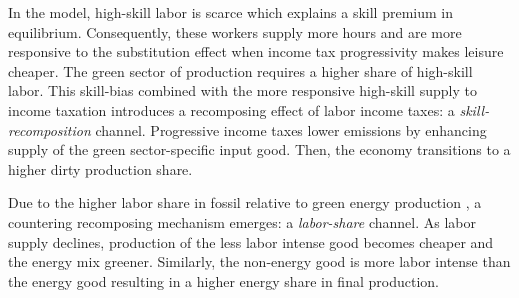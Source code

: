 
In the model, high-skill labor is scarce which explains a skill premium in equilibrium. Consequently, these workers supply more hours and are more responsive to the substitution effect when income tax progressivity makes leisure cheaper.
The green sector of production requires a higher share of high-skill labor. This skill-bias combined with the more responsive high-skill supply to income taxation introduces a recomposing effect of labor income taxes: a \textit{skill-recomposition} channel.
Progressive income taxes lower emissions by enhancing supply of the green sector-specific input good.  Then, the economy transitions to a higher dirty production share. 

Due to the higher labor share in fossil relative to green energy production \citep{Fried2018ClimateAnalysis}, a countering recomposing mechanism emerges: a \textit{labor-share} channel. As labor supply declines, production of the less labor intense good becomes cheaper and the energy mix greener. Similarly, the non-energy good is more labor intense than the energy good resulting in a higher energy share in final production. 

	\begin{comment}
content...
Directed technical change amplifies or mitigates this recomposing effect of the income tax. The market size effect renders research in the sector with the larger input market more profitable, whereas the price effect increases demand for scientists in the sector with the relatively scarcer good. Since the two energy goods are substitutes, previous research suggests that the market effect dominates and research is directed towards the sector with the bigger input market, that is, the fossil sector. 
As regards final good production, energy and non-energy goods are complements so that the price effect is expected to dominate and the recomposition towards high-skill supply should boost research in energy goods relative to non-energy goods.\footnote{\ For a discussion of these two mechanisms compare \cite{Acemoglu2002DirectedChange, Loebbing2019NationalChange, Hemous2021DirectedEconomics}.

	\end{comment}


